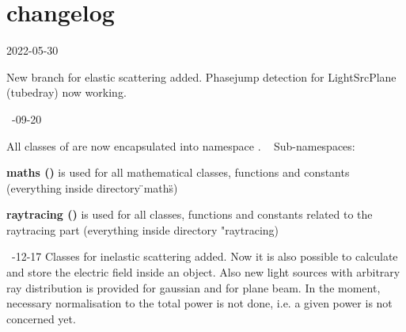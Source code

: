 \chapter{changelog}
\hypertarget{md__c_1_2_users_2weigetz9_2source_2repos_2goat_2changelog}{}\label{md__c_1_2_users_2weigetz9_2source_2repos_2goat_2changelog}
2022-\/05-\/30 

New branch for elastic scattering added. Phasejump detection for Light\+Src\+Plane (tubedray) now working. 

~-\/09-\/20 

All classes of  are now encapsulated into namespace . ~\newline
 Sub-\/namespaces\+: ~\newline
 
\begin{DoxyItemize}
\item {\bfseries{maths ()}} is used for all mathematical classes, functions and constants (everything inside directory \"{}maths\"{})  
\item {\bfseries{raytracing ()}} is used for all classes, functions and constants related to the raytracing part (everything inside directory "{}raytracing)  
\end{DoxyItemize}

~-\/12-\/17 Classes for inelastic scattering added. Now it is also possible to calculate and store the electric field inside an object. Also new light sources with arbitrary ray distribution is provided for gaussian and for plane beam. In the moment, necessary normalisation to the total power is not done, i.\+e. a given power is not concerned yet. 